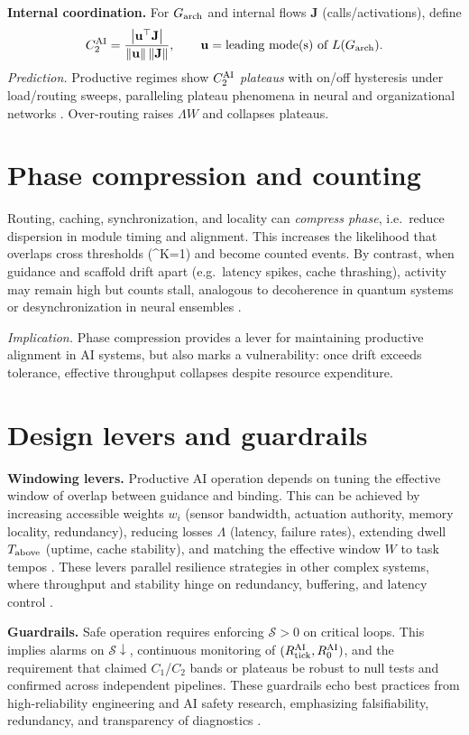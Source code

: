 \documentclass[12pt,a4paper,oneside]{scrreprt}
\def\({}%
\def\){}%
\begin{document}
\textbf{Internal coordination.}
For $G_{\rm arch}$ and internal flows $\mathbf J$ (calls/activations), define
\[
C_2^{\rm AI}=\frac{\big|\mathbf u^\top \mathbf J\big|}{\|\mathbf u\|\,\|\mathbf J\|},\qquad 
\mathbf u=\text{leading mode(s) of }L(G_{\rm arch}).
\]
\emph{Prediction.} Productive regimes show $C_2^{\rm AI}$ \emph{plateaus} with on/off hysteresis under load/routing sweeps, paralleling plateau phenomena in neural and organizational networks \cite{Deco2011,Sporns2013}. Over-routing raises $\Lambda W$ and collapses plateaus.

\section{Phase compression and counting}\label{sec:ai-phase}
Routing, caching, synchronization, and locality can \emph{compress phase}, i.e.\ reduce dispersion in module timing and alignment. 
This increases the likelihood that overlaps cross thresholds (\(\Delta\tau^K=1\)) and become counted events. 
By contrast, when guidance and scaffold drift apart (e.g.\ latency spikes, cache thrashing), activity may remain high but counts stall, analogous to decoherence in quantum systems or desynchronization in neural ensembles \cite{Pikovsky2001,Fries2005,Kitzbichler2009}. 

\emph{Implication.} Phase compression provides a lever for maintaining productive alignment in AI systems, but also marks a vulnerability: once drift exceeds tolerance, effective throughput collapses despite resource expenditure.

\section{Design levers and guardrails}\label{sec:ai-levers}
\textbf{Windowing levers.} Productive AI operation depends on tuning the effective window of overlap between guidance and binding. 
This can be achieved by increasing accessible weights $w_i$ (sensor bandwidth, actuation authority, memory locality, redundancy), reducing losses $\Lambda$ (latency, failure rates), extending dwell $T_{\rm above}$ (uptime, cache stability), and matching the effective window $W$ to task tempos \cite{Sutton2018,Dean2013}. 
These levers parallel resilience strategies in other complex systems, where throughput and stability hinge on redundancy, buffering, and latency control \cite{Perrow1999,Leveson2012}.

\textbf{Guardrails.} Safe operation requires enforcing $\mathcal S>0$ on critical loops. 
This implies alarms on $\mathcal S\!\downarrow$, continuous monitoring of $(R_{\rm tick}^{\rm AI}, R_0^{\rm AI})$, and the requirement that claimed $C_1$/$C_2$ bands or plateaus be robust to null tests and confirmed across independent pipelines. 
These guardrails echo best practices from high-reliability engineering and AI safety research, emphasizing falsifiability, redundancy, and transparency of diagnostics \cite{Amodei2016,Bostrom2014}.
\end{document}
